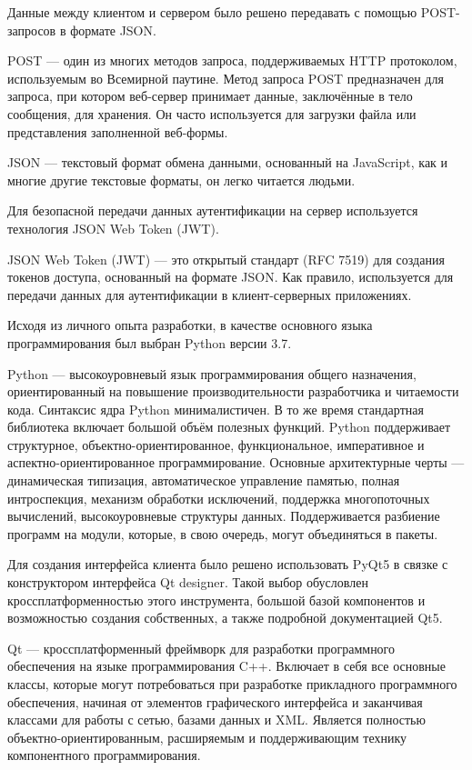 Данные между клиентом и сервером было решено передавать с помощью POST-запросов в формате JSON.
\begin{definition}
   POST --- один из многих методов запроса, поддерживаемых HTTP протоколом, используемым во Всемирной паутине.
   Метод запроса POST предназначен для запроса, при котором веб-сервер принимает данные, заключённые в тело сообщения, для хранения.
   Он часто используется для загрузки файла или представления заполненной веб-формы.
\end{definition}

\begin{definition}
   JSON --- текстовый формат обмена данными, основанный на JavaScript, как и многие другие текстовые форматы, он легко читается людьми.
\end{definition}

Для безопасной передачи данных аутентификации на сервер используется технология JSON Web Token (JWT).
\begin{definition}
   JSON Web Token (JWT) --- это открытый стандарт (RFC 7519) для создания токенов доступа, основанный на формате JSON.
   Как правило, используется для передачи данных для аутентификации в клиент-серверных приложениях.
\end{definition}

Исходя из личного опыта разработки, в качестве основного языка программирования был выбран Python версии 3.7.
\begin{definition}
   Python --- высокоуровневый язык программирования общего назначения, ориентированный на повышение производительности разработчика и читаемости кода.
   Синтаксис ядра Python минималистичен. В то же время стандартная библиотека включает большой объём полезных функций.
   Python поддерживает структурное, объектно-ориентированное, функциональное, императивное и аспектно-ориентированное программирование.
   Основные архитектурные черты --- динамическая типизация, автоматическое управление памятью, полная интроспекция, механизм обработки исключений,
   поддержка многопоточных вычислений, высокоуровневые структуры данных. Поддерживается разбиение программ на модули, которые, в свою очередь,
   могут объединяться в пакеты.
\end{definition}

Для создания интерфейса клиента было решено использовать PyQt5 в связке с конструктором интерфейса Qt designer.
Такой выбор обусловлен кроссплатформенностью этого инструмента, большой базой компонентов и возможностью создания собственных,
а также подробной документацией Qt5.
\begin{definition}
   Qt  --- кроссплатформенный фреймворк для разработки программного обеспечения на языке программирования C++.
   Включает в себя все основные классы, которые могут потребоваться при разработке прикладного программного обеспечения,
   начиная от элементов графического интерфейса и заканчивая классами для работы с сетью, базами данных и XML.
   Является полностью объектно-ориентированным, расширяемым и поддерживающим технику компонентного программирования.
\end{definition}

